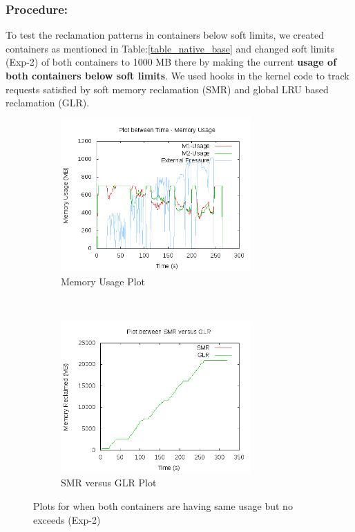     \subsubsection{Procedure:}  
      To test the reclamation patterns in containers below soft limits, we created containers as mentioned in Table:\ref{table_native_base} 
and changed soft limits (Exp-2) of both containers to 1000 MB there by making the current \textbf{usage of both containers below soft 
limits}. We used hooks in the kernel code to track requests satisfied by soft memory reclamation (SMR) and global LRU based reclamation 
(GLR).
      
      \begin{figure}[t!]
	  \centering
	  \begin{subfigure}[t]{0.48\textwidth}
	    \centering
	    \includegraphics[width=0.8\textwidth]{images/experimentation/global_lru/mu.png}
	    \caption{Memory Usage Plot}
	    \label{img_no_sl_mu}
	  \end{subfigure}
	  ~ 
	  \begin{subfigure}[t]{0.48\textwidth}
	    \centering
	    \includegraphics[width=0.8\textwidth]{images/experimentation/global_lru/compare.png}
	    \caption{SMR versus GLR Plot}
	    \label{img_no_sl_global_vs_local}
	  \end{subfigure}
	  \caption{Plots for when both containers are having same usage but no exceeds (Exp-2)}
	\end{figure}
      
